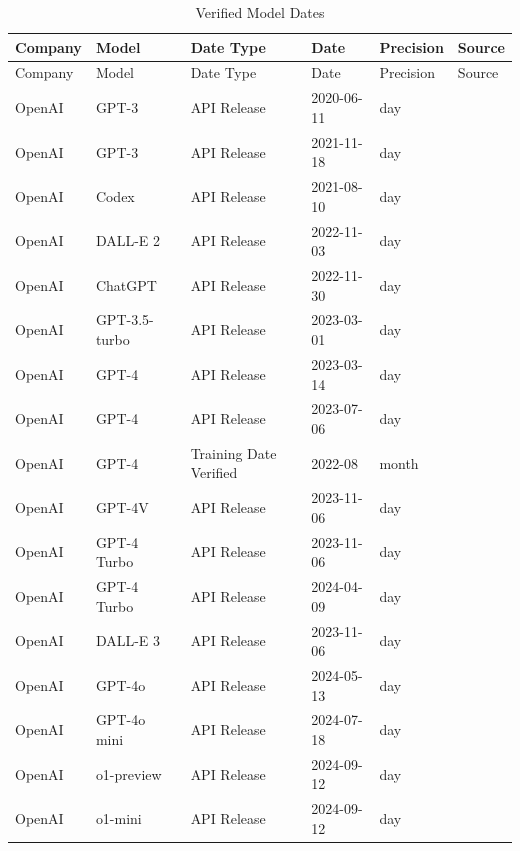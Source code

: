 \documentclass[sigconf]{acmart}
\begin{document}
\begin{longtable}{p{2.2cm} p{3.4cm} p{3.0cm} p{2.3cm} p{1.6cm} p{2.0cm}}
\caption{Verified Model Dates}
\label{tab:verified_model_dates}\\
\toprule
Company & Model & Date Type & Date & Precision & Source \\
\midrule
\endfirsthead

\toprule
Company & Model & Date Type & Date & Precision & Source \\
\midrule
\endhead

\bottomrule
\endfoot

OpenAI & GPT-3 & API Release & 2020-06-11 & day & \cite{openai_api_2020} \\
OpenAI & GPT-3 & API Release & 2021-11-18 & day & \cite{openai_api_nowaitlist_2021} \\
OpenAI & Codex & API Release & 2021-08-10 & day & \cite{openai_codex_2021} \\
OpenAI & DALL-E 2 & API Release & 2022-11-03 & day & \cite{openai_dalle_api_beta_2022} \\
OpenAI & ChatGPT & API Release & 2022-11-30 & day & \cite{openai_chatgpt_2022} \\
OpenAI & GPT-3.5-turbo & API Release & 2023-03-01 & day & \cite{openai_chatgpt_whisper_apis_2023} \\
OpenAI & GPT-4 & API Release & 2023-03-14 & day & \cite{openai_gpt4_2023} \\
OpenAI & GPT-4 & API Release & 2023-07-06 & day & \cite{openai_gpt4_api_ga_2023} \\
OpenAI & GPT-4 & Training Date Verified & 2022-08 & month & \cite{openai_gpt4_system_card_2023} \\
OpenAI & GPT-4V & API Release & 2023-11-06 & day & \cite{openai_devday_2023} \\
OpenAI & GPT-4 Turbo & API Release & 2023-11-06 & day & \cite{openai_devday_2023} \\
OpenAI & GPT-4 Turbo & API Release & 2024-04-09 & day & \cite{openai_embeddings_api_updates_2024} \\
OpenAI & DALL-E 3 & API Release & 2023-11-06 & day & \cite{openai_devday_2023} \\
OpenAI & GPT-4o & API Release & 2024-05-13 & day & \cite{openai_hello_gpt4o_2024} \\
OpenAI & GPT-4o mini & API Release & 2024-07-18 & day & \cite{openai_gpt4o_mini_2024} \\
OpenAI & o1-preview & API Release & 2024-09-12 & day & \cite{openai_o1_preview_2024} \\
OpenAI & o1-mini & API Release & 2024-09-12 & day & \cite{openai_o1_preview_2024} \\


\end{longtable}
\end{document}
